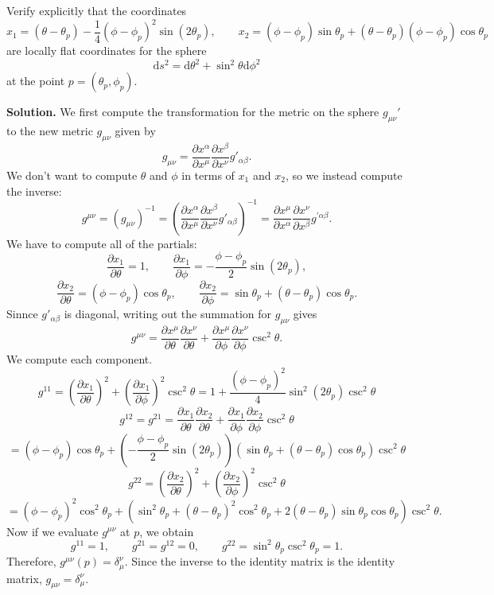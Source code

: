 \documentclass[11pt, letterpaper]{article}
\begin{document}
\begin{problem}
	Verify explicitly that the coordinates
	\[
		x_1 = \left( \theta -\theta _p \right) -\frac{1}{4} \left( \phi -\phi _p \right) ^2 \sin \left( 2\theta _p \right) ,\qquad x_2 = \left( \phi -\phi _p \right) \sin \theta _p+\left( \theta -\theta _p \right) \left( \phi -\phi _p \right) \cos \theta _p
	\]
	are locally flat coordinates for the sphere
	\[
		\mathrm{d} s^2 = \mathrm{d} \theta ^2 + \sin ^2\theta \mathrm{d} \phi ^2
	\]
	at the point $p=(\theta _p,\phi _p)$.
\end{problem}
\noindent \textbf{Solution.} We first compute the transformation for the metric on the sphere $g_{\mu \nu } '$ to the new metric $g_{\mu \nu } $ given by
\[
	g_{\mu \nu } =\frac{\partial x^\alpha }{\partial x^\mu  } \frac{\partial x^\beta  }{\partial x^\nu } g'_{\alpha \beta } 
.\]
We don't want to compute $\theta $ and $\phi $ in terms of $x_1$ and $x_2$, so we instead compute the inverse:
\[
	g^{\mu \nu } =\left( g_{\mu \nu }  \right) ^{-1} =\left( \frac{\partial x^\alpha }{\partial x^\mu } \frac{\partial x^\beta }{\partial x^\nu } g'_{\alpha \beta }  \right) ^{-1} =\frac{\partial x^\mu }{\partial x^\alpha } \frac{\partial x^\nu }{\partial x^\beta } g^{\prime \alpha \beta } 
.\]
We have to compute all of the partials:
\[
	\frac{\partial x_1}{\partial \theta } =1,\qquad \frac{\partial x_1}{\partial \phi } =-\frac{\phi -\phi _p}{2} \sin (2\theta _p),
\]
\[
	\frac{\partial x_2}{\partial \theta } =\left( \phi -\phi _p \right) \cos \theta _p,\qquad \frac{\partial x_2}{\partial \phi } =\sin \theta _p+\left( \theta -\theta _p \right) \cos \theta _p
.\]
Sinnce $g'_{\alpha \beta } $ is diagonal, writing out the summation for $g_{\mu \nu } $ gives
\[
	g^{\mu \nu } =\frac{\partial x^\mu }{\partial \theta } \frac{\partial x^\nu }{\partial \theta } +\frac{\partial x^\mu }{\partial \phi } \frac{\partial x^\nu }{\partial \phi } \csc ^2\theta 
.\]
We compute each component.
\[
	g^{11} = \left( \frac{\partial x_1}{\partial \theta }  \right) ^2+\left( \frac{\partial x_1}{\partial \phi }  \right) ^2 \csc ^2\theta = 1+\frac{\left( \phi -\phi _p \right) ^2}{4} \sin ^2\left( 2\theta _p \right) \csc ^2\theta 
\]
\[
	g^{12} =g^{21} = \frac{\partial x_1}{\partial \theta } \frac{\partial x_2}{\partial \theta } +\frac{\partial x_1}{\partial \phi } \frac{\partial x_2}{\partial \phi } \csc ^2\theta
\]
\[
	=(\phi -\phi _p)\cos \theta _p+\left( -\frac{\phi -\phi _p}{2} \sin (2\theta _p) \right) \left( \sin \theta _p+(\theta -\theta _p)\cos \theta _p \right) \csc ^2\theta 
\]
\[
	g^{22} =\left( \frac{\partial x_2}{\partial \theta }  \right) ^2 + \left( \frac{\partial x_2}{\partial \phi }  \right) ^2 \csc^2 \theta 
\]
\[
	=\left( \phi -\phi _p \right) ^2 \cos ^2\theta _p + \left( \sin ^2\theta _p + (\theta -\theta _p)^2 \cos ^2\theta _p + 2 (\theta -\theta _p)\sin \theta _p \cos \theta _p \right) \csc ^2\theta 
.\]
Now if we evaluate $g^{\mu \nu } $ at $p$, we obtain
\[
	g^{11} =1,\qquad g^{21} =g^{12} =0,\qquad g^{22} = \sin ^2\theta _p \csc ^2\theta _p = 1
.\]
Therefore, $g^{\mu \nu } (p)=\delta _\mu ^\nu $. Since the inverse to the identity matrix is the identity matrix, $g_{\mu \nu } =\delta _\mu ^\nu $.
\end{document}
